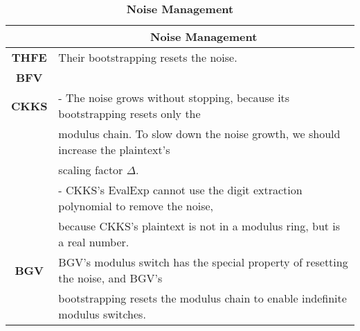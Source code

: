 \begin{table}[h]
\begin{tabular}{|c||l|}
\hline
&\multicolumn{1}{c|}{\textbf{Noise Management}}\\\hline\hline
\textbf{THFE}&Their bootstrapping resets the noise.\\
\textbf{BFV}&\\\hline
\textbf{CKKS}&- The noise grows without stopping, because its bootstrapping resets only the\\
& modulus chain. To slow down the noise growth, we should increase the plaintext's\\
&  scaling factor $\Delta$.\\
&- CKKS's \textsf{EvalExp} cannot use the digit extraction polynomial to remove the noise, \\
&because CKKS's plaintext is not in a modulus ring, but is a real number.\\\hline
\textbf{BGV}&BGV's modulus switch has the special property of resetting the noise, and BGV's\\
& bootstrapping resets the modulus chain to enable indefinite modulus switches.\\\hline
\end{tabular}
\caption{\textbf{Noise Management}}
\end{table}
